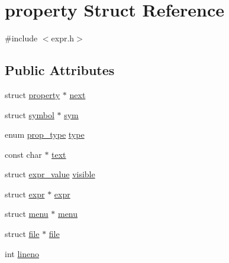 \hypertarget{structproperty}{\section{property Struct Reference}
\label{structproperty}
}


{\ttfamily \#include $<$expr.\-h$>$}

\subsection*{Public Attributes}
\begin{DoxyCompactItemize}
\item 
struct \hyperlink{structproperty}{property} $\ast$ \hyperlink{structproperty_abc7f235ce9af18a5d26baf5be06c7af7}{next}
\item 
struct \hyperlink{structsymbol}{symbol} $\ast$ \hyperlink{structproperty_aa7c9129f74d0d393543f6c2dabf5fe6d}{sym}
\item 
enum \hyperlink{expr_8h_a403a578df6dfdc7e86f6bca789c523c2}{prop\-\_\-type} \hyperlink{structproperty_ad06376f6f75b5fb29e9066735fac4348}{type}
\item 
const char $\ast$ \hyperlink{structproperty_ac2743f21c2a2d7b7f79b0cee7dd1c313}{text}
\item 
struct \hyperlink{structexpr__value}{expr\-\_\-value} \hyperlink{structproperty_aa7da8f1af39de7702324ef8d64554ea5}{visible}
\item 
struct \hyperlink{structexpr}{expr} $\ast$ \hyperlink{structproperty_a1bd14e5a3072108ed7144ee002826295}{expr}
\item 
struct \hyperlink{structmenu}{menu} $\ast$ \hyperlink{structproperty_a311fc71d4d74c760073ddb383e0096c3}{menu}
\item 
struct \hyperlink{structfile}{file} $\ast$ \hyperlink{structproperty_a1a9c86981b5d72e201745eb5083d08b2}{file}
\item 
int \hyperlink{structproperty_af891a826e4d277350cd0b5f5b0f1451e}{lineno}
\end{DoxyCompactItemize}


